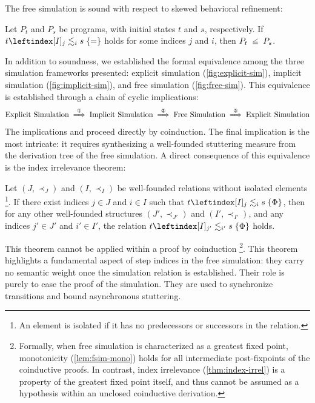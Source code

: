 \documentclass[report.tex]{subfiles}
\begin{document}
The free simulation is sound
with respect to skewed behavioral refinement:
\begin{theorem}
  \label{thm:fsim-soundness}
  Let $P_t$ and $P_s$ be programs,
  with initial states $t$ and $s$,
  respectively.
  If $\fsim{t}{j}{i}{s}{=}$ holds for some indices $j$ and $i$,
  then $P_t \slantsqsubseteq P_s$.
\end{theorem}

In addition to soundness,
we established the formal equivalence
among the three simulation frameworks presented:
explicit simulation (\cref{fig:explicit-sim}),
implicit simulation (\cref{fig:implicit-sim}),
and free simulation (\cref{fig:free-sim}).
This equivalence is established through a chain of cyclic implications:
\begin{equation*}
  \text{Explicit Simulation}
  \overset{\text{\ding{172}}}{\implies}
  \text{Implicit Simulation}
  \overset{\text{\ding{173}}}{\implies}
  \text{Free Simulation}
  \overset{\text{\ding{174}}}{\implies}
  \text{Explicit Simulation}
\end{equation*}
The implications  and 
proceed directly by coinduction.
The final implication  is the most intricate:
it requires synthesizing a well-founded stuttering measure
from the derivation tree of the free simulation.
A direct consequence of this equivalence is the index irrelevance theorem:
\begin{theorem}
  \label{thm:index-irrel}
  Let $(J, \prec_J)$ and $(I, \prec_I)$
  be well-founded relations without isolated elements%
  \footnote{An element is isolated
    if it has no predecessors or successors in the relation.}.
  If there exist indices $j \in J$ and $i \in I$
  such that $\fsim{t}{j}{i}{s}{\Phi}$,
  then for any other well-founded structures
  $(J', \prec_{J'})$ and $(I', \prec_{I'})$,
  and any indices $j' \in J'$ and $i' \in I'$,
  the relation $\fsim{t}{j'}{i'}{s}{\Phi}$ holds.
\end{theorem}

This theorem cannot be applied within a proof by coinduction%
\footnote{
  Formally,
  when free simulation is characterized as a greatest fixed point,
  monotonicity (\cref{lem:fsim-mono}) holds
  for all intermediate post-fixpoints of the coinductive proofs.
  In contrast,
  index irrelevance (\cref{thm:index-irrel}) is a property
  of the greatest fixed point itself,
  and thus cannot be assumed as a hypothesis
  within an unclosed coinductive derivation.
}.
This theorem highlights a fundamental aspect
of step indices in the free simulation:
they carry no semantic weight once the simulation relation is established.
Their role is purely to ease the proof of the simulation.
They are used to synchronize transitions and bound asynchronous stuttering.
\end{document}
